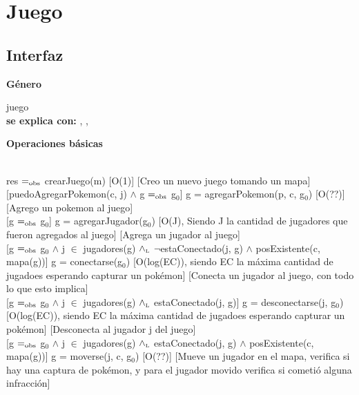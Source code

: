 \section{Juego}

\subsection{Interfaz}

\parbox {1,7cm}{{\bf Género}} juego \\
{\bf se explica con:}  ,  , \\
\medskip

\parbox {1,5cm}{\bf{Operaciones básicas}}\\

{res $=_{\mathrm{obs}}$ crearJuego(m)}
[O(1)]
[Creo un nuevo juego tomando un mapa]\\

[puedoAgregarPokemon(c, j) $\wedge$ g $=_{\mathrm{obs}}$ g$_0$]
{g = agregarPokemon(p, c, g$_0$)}
[O(??)]
[Agrego un pokemon al juego]\\

[g $=_{\mathrm{obs}}$ g$_0$]
{g = agregarJugador(g$_0$)}
[O(J), Siendo J la cantidad de jugadores que fueron agregados al juego]
[Agrega un jugador al juego]\\

[g $=_{\mathrm{obs}}$ g$_0$ $\wedge$ j $\in$ jugadores(g) $\land_{\mathrm{\scriptscriptstyle{L}}}$ $\neg$estaConectado(j, g) $\wedge$ posExistente(c, mapa(g))]
{g = conectarse(g$_0$)}
[O(log(EC)), siendo EC la máxima cantidad de jugadoes esperando capturar un pokémon]
[Conecta un jugador al juego, con todo lo que esto implica]\\

[g $=_{\mathrm{obs}}$ g$_0$ $\wedge$ j $\in$ jugadores(g) $\land_{\mathrm{\scriptscriptstyle{L}}}$ estaConectado(j, g)]
{g = desconectarse(j, g$_0$)}
[O(log(EC)), siendo EC la máxima cantidad de jugadoes esperando capturar un pokémon]
[Desconecta al jugador j del juego]\\

[g $=_{\mathrm{obs}}$ g$_0$ $\wedge$ j $\in$ jugadores(g) $\land_{\mathrm{\scriptscriptstyle{L}}}$ estaConectado(j, g) $\wedge$ posExistente(c, mapa(g))]
{g = moverse(j, c, g$_0$)}
[O(??)]
[Mueve un jugador en el mapa, verifica si hay una captura de pokémon, y para el jugador movido verifica si cometió alguna infracción]\\

